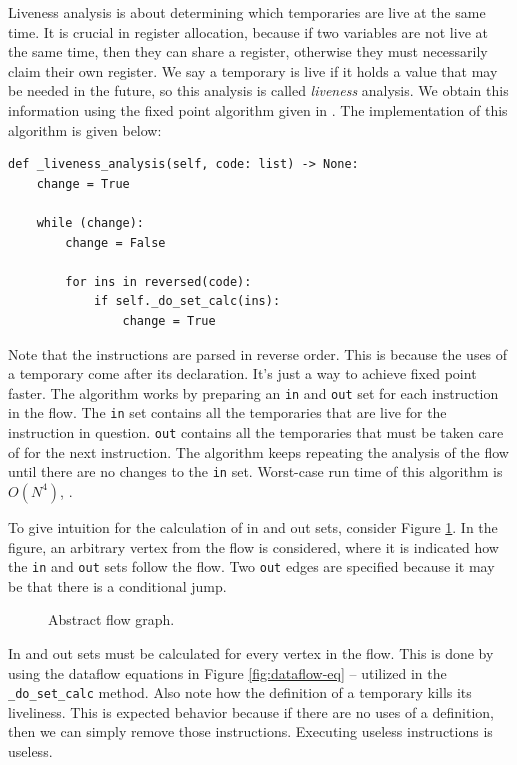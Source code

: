Liveness analysis is about determining which temporaries are live at the same time. It is crucial in register allocation, because if two variables are not live at the same time, then they can share a register, otherwise they must necessarily claim their own register. We say a temporary is live if it holds a value that may be needed in the future, so this analysis is called \textit{liveness} analysis. We obtain this information using the fixed point algorithm given in \cite[221]{ModernCompilerImplementation}. The implementation of this algorithm is given below:

\begin{verbatim}
def _liveness_analysis(self, code: list) -> None:
    change = True

    while (change):
        change = False

        for ins in reversed(code):
            if self._do_set_calc(ins):
                change = True
\end{verbatim}

Note that the instructions are parsed in reverse order. This is because the uses of a temporary come after its declaration. It's just a way to achieve fixed point faster. The algorithm works by preparing an \texttt{in} and \texttt{out} set for each instruction in the flow. The \texttt{in} set contains all the temporaries that are live for the instruction in question. \texttt{out} contains all the temporaries that must be taken care of for the next instruction. The algorithm keeps repeating the analysis of the flow until there are no changes to the \texttt{in} set. Worst-case run time of this algorithm is $O(N^4)$, \cite[224]{ModernCompilerImplementation}. 

To give intuition for the calculation of in and out sets, consider Figure \ref{fig:in-out-flow}. In the figure, an arbitrary vertex from the flow is considered, where it is indicated how the \texttt{in} and \texttt{out} sets follow the flow. Two \texttt{out} edges are specified because it may be that there is a conditional jump.

\begin{figure}[H]
    \centering
    
    \caption{Abstract flow graph.}
    \label{fig:in-out-flow}
\end{figure}

In and out sets must be calculated for every vertex in the flow. This is done by using the dataflow equations in Figure \ref{fig:dataflow-eq} -- utilized in the \texttt{\_do\_set\_calc} method. Also note how the definition of a temporary kills its liveliness. This is expected behavior because if there are no uses of a definition, then we can simply remove those instructions. Executing useless instructions is useless. 

